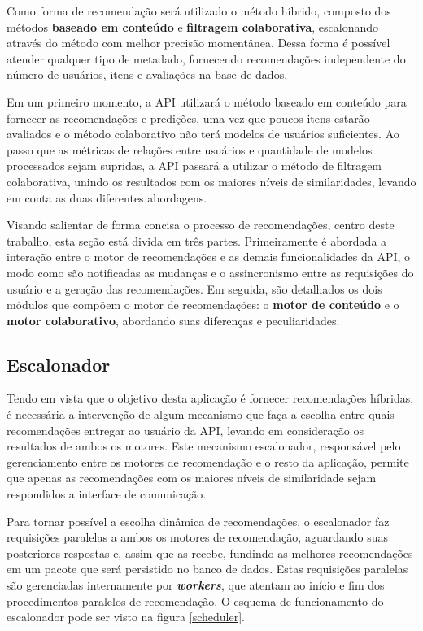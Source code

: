 \documentclass[12pt, openright, oneside, a4paper, brazil]{abntex2}
\begin{document}
Como forma de recomendação será utilizado o método híbrido, composto dos métodos \textbf{baseado em conteúdo} e \textbf{filtragem colaborativa}, escalonando através do método com melhor precisão momentânea. Dessa forma é possível atender qualquer tipo de metadado, fornecendo recomendações independente do número de usuários, itens e avaliações na base de dados.

Em um primeiro momento, a API utilizará o método baseado em conteúdo para fornecer as recomendações e predições, uma vez que poucos itens estarão avaliados e o método colaborativo não terá modelos de usuários suficientes. Ao passo que as métricas de relações entre usuários e quantidade de modelos processados sejam supridas, a API passará a utilizar o método de filtragem colaborativa, unindo os resultados com os maiores níveis de similaridades, levando em conta as duas diferentes abordagens.

Visando salientar de forma concisa o processo de recomendações, centro deste trabalho, esta seção está divida em três partes. Primeiramente é abordada a interação entre o motor de recomendações e as demais funcionalidades da API, o modo como são notificadas as mudanças e o assincronismo entre as requisições do usuário e a geração das recomendações. Em seguida, são detalhados os dois módulos que compõem o motor de recomendações: o \textbf{motor de conteúdo} e o \textbf{motor colaborativo}, abordando suas diferenças e peculiaridades.

\subsection{Escalonador} \label{motor:async}

Tendo em vista que o objetivo desta aplicação é fornecer recomendações híbridas, é necessária a intervenção de algum mecanismo que faça a escolha entre quais recomendações entregar ao usuário da API, levando em consideração os resultados de ambos os motores. Este mecanismo escalonador, responsável pelo gerenciamento entre os motores de recomendação e o resto da aplicação, permite que apenas as recomendações com os maiores níveis de similaridade sejam respondidos a interface de comunicação.

Para tornar possível a escolha dinâmica de recomendações, o escalonador faz requisições paralelas a ambos os motores de recomendação, aguardando suas posteriores respostas e, assim que as recebe, fundindo as melhores recomendações em um pacote que será persistido no banco de dados. Estas requisições paralelas são gerenciadas internamente por \textit{\textbf{workers}}, que atentam ao início e fim dos procedimentos paralelos de recomendação. O esquema de funcionamento do escalonador pode ser visto na figura \ref{scheduler}.
\end{document}
